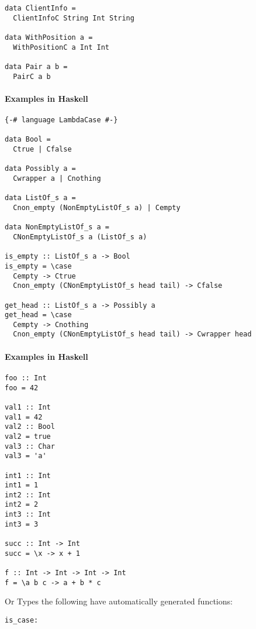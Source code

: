 \documentclass{article}
\def\H{Haskell}
\begin{document}
\begin{verbatim}
data ClientInfo =
  ClientInfoC String Int String

data WithPosition a = 
  WithPositionC a Int Int

data Pair a b = 
  PairC a b
\end{verbatim}

\paragraph{Examples in \H}

\begin{verbatim}
{-# language LambdaCase #-}

data Bool =
  Ctrue | Cfalse

data Possibly a =
  Cwrapper a | Cnothing

data ListOf_s a =
  Cnon_empty (NonEmptyListOf_s a) | Cempty

data NonEmptyListOf_s a =
  CNonEmptyListOf_s a (ListOf_s a)

is_empty :: ListOf_s a -> Bool
is_empty = \case
  Cempty -> Ctrue
  Cnon_empty (CNonEmptyListOf_s head tail) -> Cfalse

get_head :: ListOf_s a -> Possibly a
get_head = \case
  Cempty -> Cnothing
  Cnon_empty (CNonEmptyListOf_s head tail) -> Cwrapper head
\end{verbatim}

\paragraph{Examples in \H}
\begin{verbatim}
foo :: Int
foo = 42

val1 :: Int
val1 = 42
val2 :: Bool
val2 = true
val3 :: Char
val3 = 'a'

int1 :: Int
int1 = 1
int2 :: Int
int2 = 2
int3 :: Int
int3 = 3

succ :: Int -> Int
succ = \x -> x + 1

f :: Int -> Int -> Int -> Int
f = \a b c -> a + b * c
\end{verbatim}

Or Types the following have automatically generated functions:

\begin{verbatim}
is_case:
\end{verbatim}

%
\end{document}
